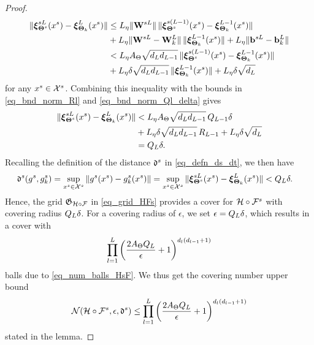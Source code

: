 \documentclass[review,supplement,onefignum,onetabnum]{siamonline250211}
\begin{document}
\begin{proof}
\begin{equation}
\begin{split}
 \| \boldsymbol{\xi}^{sL}_{\boldsymbol{\Theta}^{s}}(x^s) - \boldsymbol{\xi}^{L}_{\boldsymbol{\Theta}_k}(x^s)  \|   
&   \leq
 {L_\eta} 
 \|  \mathbf{W}^{sL} \|  \,  \|   \boldsymbol{\xi}^{s(L-1)}_{\boldsymbol{\Theta}^{s}}(x^s)  - \boldsymbol{\xi}^{L-1}_{\boldsymbol{\Theta}_k}(x^s)  \| \\
 &+{L_\eta}
 \|  \mathbf{W}^{sL}  - \mathbf{W}^{L}_k \| \, \| \boldsymbol{\xi}^{L-1}_{\boldsymbol{\Theta}_k}(x^s) \| 
 +{L_\eta}
 \| \mathbf{b}^{sL} - \mathbf{b}^{L}_k \| \\
&< 
 {L_\eta} 
 {A_\Theta} \sqrt{{d_L} {d_{L-1}}} \,  \|   \boldsymbol{\xi}^{s(L-1)}_{\boldsymbol{\Theta}^{s}}(x^s)  - \boldsymbol{\xi}^{L-1}_{\boldsymbol{\Theta}_k}(x^s)  \| \\
 &+{L_\eta}
 \delta \sqrt{{d_L} {d_{L-1}}} \, \| \boldsymbol{\xi}^{L-1}_{\boldsymbol{\Theta}_k}(x^s) \|
 +{L_\eta}
 \delta \sqrt{{d_L}}
\end{split}
\end{equation}
%
for any $x^s \in \mathcal{X}^s$. Combining this inequality with the bounds in \eqref{eq_bnd_norm_Rl} and \eqref{eq_bnd_norm_Ql_delta} gives
%
\begin{equation*}
\begin{split}
 \| \boldsymbol{\xi}^{sL}_{\boldsymbol{\Theta}^{s}}(x^s) - \boldsymbol{\xi}^{L}_{\boldsymbol{\Theta}_k}(x^s)  \|   
&   <
 {L_\eta} 
 {A_\Theta} \sqrt{{d_L} {d_{L-1}}} \,  {Q_{L-1}}  \delta \\
 &+{L_\eta}
 \delta \sqrt{{d_L} {d_{L-1}}} \, {R_{L-1}}
 +{L_\eta}
 \delta \sqrt{{d_L}} \\
 &= {Q_L} \delta.
\end{split}
\end{equation*}
%
Recalling the definition of the distance $\mathfrak{d}^s $ in \eqref{eq_defn_ds_dt}, we then have
%
\begin{equation*}
\begin{split}
\mathfrak{d}^s(g^s, g^s_k) &= \sup_{x^s \in \mathcal{X}^s} \| g^s(x^s) - g^s_k(x^s)  \| 
=  \sup_{x^s \in \mathcal{X}^s} \|  \boldsymbol{\xi}^{sL}_{\boldsymbol{\Theta}^{s}} (x^s)  -  \boldsymbol{\xi}^{L}_{\boldsymbol{\Theta}_k} (x^s)  \| 
< {Q_L} \delta.
\end{split}
\end{equation*}
%
Hence, the grid $\mathfrak{G}_{\mathcal{H} \circ \mathcal{F}}$ in \eqref{eq_grid_HFs} provides a cover for $ \mathcal{H} \circ \mathcal{F}^s$ with covering radius ${Q_L} \delta$. For a covering radius of $\epsilon $, we set $\epsilon={Q_L} \delta$, which results in a cover with 
%
\begin{equation}
\begin{split}
\prod_{l=1}^{L}  \left( \frac{2 {A_\Theta} {Q_L}}{\epsilon}+1  \right)^{ {d_l}({d_{l-1}}+1) }
\end{split}
\end{equation}
%
balls due to \eqref{eq_num_balls_HsF}. We thus get the covering number upper bound
%
\begin{equation*}
\begin{split}
\mathcal{N}( \mathcal{H} \circ \mathcal{F}^s, \epsilon, \mathfrak{d}^s) \leq  \prod_{l=1}^{L}  \left( \frac{2 {A_\Theta} {Q_L}}{\epsilon}+1  \right)^{ {d_l}({d_{l-1}}+1) } \\
\end{split}
\end{equation*}
%
stated in the lemma.


\end{proof}
\end{document}
